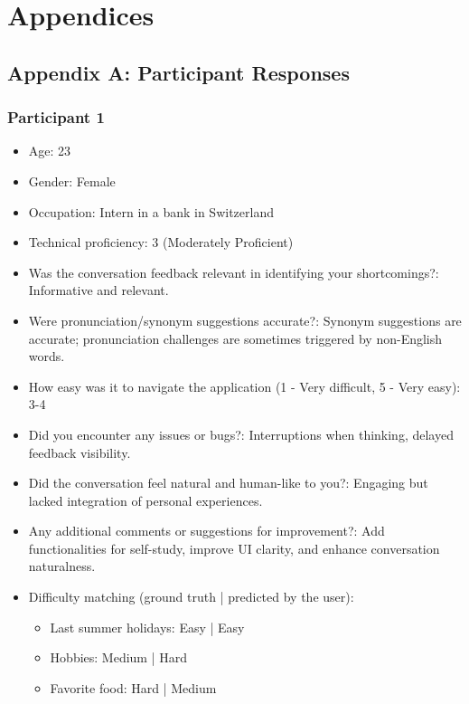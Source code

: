 \documentclass{article}
\begin{document}
\section{Appendices}

\subsection{Appendix A: Participant Responses}

\subsubsection{Participant 1}
\begin{itemize}
    \item Age: 23
    \item Gender: Female
    \item Occupation: Intern in a bank in Switzerland
    \item Technical proficiency: 3 (Moderately Proficient)
    \item Was the conversation feedback relevant in identifying your shortcomings?: Informative and relevant.
    \item Were pronunciation/synonym suggestions accurate?: Synonym suggestions are accurate; pronunciation challenges are sometimes triggered by non-English words.
    \item How easy was it to navigate the application (1 - Very difficult, 5 - Very easy): 3-4
    \item Did you encounter any issues or bugs?: Interruptions when thinking, delayed feedback visibility.
    \item Did the conversation feel natural and human-like to you?: Engaging but lacked integration of personal experiences.
    \item Any additional comments or suggestions for improvement?: Add functionalities for self-study, improve UI clarity, and enhance conversation naturalness.
    \item Difficulty matching (ground truth | predicted by the user):
    \begin{itemize}
        \item Last summer holidays: Easy | Easy
        \item Hobbies: Medium | Hard
        \item Favorite food: Hard | Medium
    \end{itemize}
\end{itemize}
\end{document}
